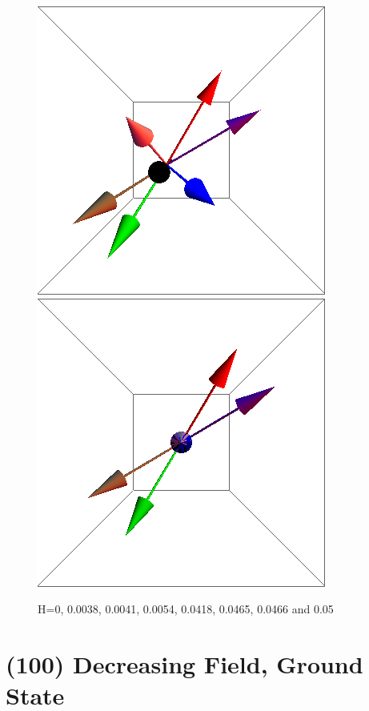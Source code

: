 \documentclass{article}
\begin{document}
\begin{figure}[ht]
\includegraphics[scale=0.28]{100/467S000to005G.png}
\includegraphics[scale=0.28]{100/501S000to005G.png}
\caption{H=0, 0.0038, 0.0041, 0.0054, 0.0418, 0.0465, 0.0466 and 0.05}
\end{figure}

\clearpage
\section{(100) Decreasing Field, Ground State}
\end{document}

